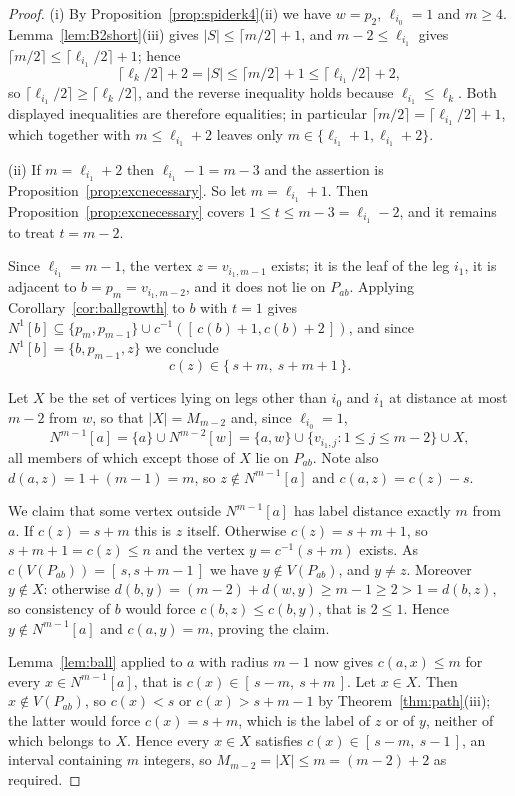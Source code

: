\documentclass[reqno,10pt]{article}
\theoremstyle{definition}
\numberwithin{equation}{section}
\numberwithin{theorem}{section}
\newcommand{\Ball}[2]{N^{#2}[#1]}
\newcommand{\Ntwo}{M}
\begin{document}
\begin{proof}
(i) By Proposition~\ref{prop:spiderk4}(ii) we have $w=p_2$, $\ell_{i_0}=1$ and
$m\ge4$. Lemma~\ref{lem:B2short}(iii) gives $|S|\le\lceil m/2\rceil+1$, and
$m-2\le \ell_{i_1}$ gives $\lceil m/2\rceil\le\lceil \ell_{i_1}/2\rceil+1$;
hence
\[
  \bigl\lceil \ell_k/2\bigr\rceil+2=|S|\le\bigl\lceil m/2\bigr\rceil+1
  \le\bigl\lceil \ell_{i_1}/2\bigr\rceil+2 ,
\]
so $\lceil \ell_{i_1}/2\rceil\ge\lceil \ell_k/2\rceil$, and the reverse
inequality holds because $\ell_{i_1}\le \ell_k$. Both displayed inequalities
are therefore equalities; in particular
$\lceil m/2\rceil=\lceil \ell_{i_1}/2\rceil+1$, which together with
$m\le \ell_{i_1}+2$ leaves only $m\in\{\ell_{i_1}+1,\ell_{i_1}+2\}$.

\smallskip
\noindent(ii) If $m=\ell_{i_1}+2$ then $\ell_{i_1}-1=m-3$ and the assertion is
Proposition~\ref{prop:excnecessary}. So let $m=\ell_{i_1}+1$. Then
Proposition~\ref{prop:excnecessary} covers $1\le t\le m-3=\ell_{i_1}-2$, and it
remains to treat $t=m-2$.

Since $\ell_{i_1}=m-1$, the vertex $z=v_{i_1,m-1}$ exists; it is the leaf of the
leg $i_1$, it is adjacent to $b=p_m=v_{i_1,m-2}$, and it does not lie on
$P_{ab}$. Applying Corollary~\ref{cor:ballgrowth} to $b$ with $t=1$ gives
$\Ball{b}{1}\subseteq\{p_m,p_{m-1}\}\cup c^{-1}([\,c(b)+1,c(b)+2\,])$, and since
$\Ball{b}{1}=\{b,p_{m-1},z\}$ we conclude
\[
  c(z)\in\{\,s+m,\ s+m+1\,\}.
\]

Let $X$ be the set of vertices lying on legs other than $i_0$ and $i_1$ at
distance at most $m-2$ from $w$, so that $|X|=\Ntwo_{m-2}$ and, since
$\ell_{i_0}=1$,
\[
  \Ball{a}{m-1}=\{a\}\cup\Ball{w}{m-2}
  =\{a,w\}\cup\{v_{i_1,j}:1\le j\le m-2\}\cup X ,
\]
all members of which except those of $X$ lie on $P_{ab}$. Note also
$d(a,z)=1+(m-1)=m$, so $z\notin\Ball{a}{m-1}$ and $c(a,z)=c(z)-s$.

We claim that some vertex outside $\Ball{a}{m-1}$ has label distance exactly $m$
from $a$. If $c(z)=s+m$ this is $z$ itself. Otherwise $c(z)=s+m+1$, so
$s+m+1=c(z)\le n$ and the vertex $y=c^{-1}(s+m)$ exists. As
$c(V(P_{ab}))=[\,s,s+m-1\,]$ we have $y\notin V(P_{ab})$, and $y\ne z$.
Moreover $y\notin X$: otherwise $d(b,y)=(m-2)+d(w,y)\ge m-1\ge2>1=d(b,z)$, so
consistency of $b$ would force $c(b,z)\le c(b,y)$, that is $2\le1$. Hence
$y\notin\Ball{a}{m-1}$ and $c(a,y)=m$, proving the claim.

Lemma~\ref{lem:ball} applied to $a$ with radius $m-1$ now gives $c(a,x)\le m$
for every $x\in\Ball{a}{m-1}$, that is $c(x)\in[\,s-m,\ s+m\,]$. Let $x\in X$.
Then $x\notin V(P_{ab})$, so $c(x)<s$ or $c(x)>s+m-1$ by
Theorem~\ref{thm:path}(iii); the latter would force $c(x)=s+m$, which is the
label of $z$ or of $y$, neither of which belongs to $X$. Hence every $x\in X$
satisfies $c(x)\in[\,s-m,\ s-1\,]$, an interval containing $m$ integers, so
$\Ntwo_{m-2}=|X|\le m=(m-2)+2$ as required.
\end{proof}
\end{document}
